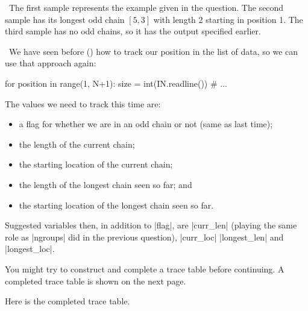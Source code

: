 \Explanation\ The first sample represents the example given in the question. The second
sample has its longest odd chain $[5,3]$ with length 2 starting in position 1. The third
sample has no odd chains, so it has the output specified earlier.

\Scratch\ We have seen before () how to track our
position in the list of data, so we can use that approach again:
\begin{pythoncode}
  for position in range(1, N+1):
    size = int(IN.readline())
    # ...
\end{pythoncode}

The values we need to track this time are:
\begin{itemize}
  \item a flag for whether we are in an odd chain or not (same as last time);
  \item the length of the current chain;
  \item the starting location of the current chain;
  \item the length of the longest chain seen so far; and
  \item the starting location of the longest chain seen so far.
\end{itemize}

Suggested variables then, in addition to \pycode|flag|, are \pycode|curr_len| (playing the
same role as \pycode|ngroups| did in the previous question), \pycode|curr_loc|
\pycode|longest_len| and \pycode|longest_loc|.

You might try to construct and complete a trace table before continuing. A completed trace
table is shown on the next page.


\clearpage %

Here is the completed trace table.

